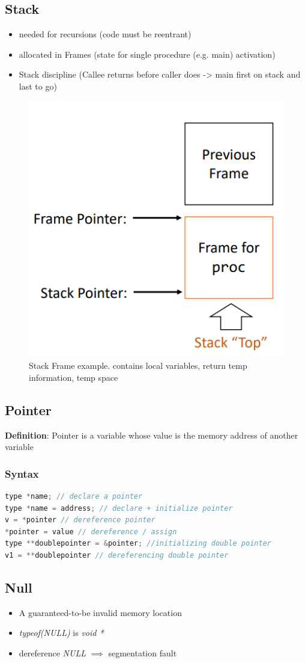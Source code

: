 \documentclass[a4paper,10pt]{article}
\begin{document}
\subsection{Stack}
\begin{itemize}
    \item needed for recursions (code must be reentrant)
    \item allocated in Frames (state for single procedure (e.g. main) activation)
    \item Stack discipline (Callee returns before caller does -> main first on stack and last to go)
\end{itemize}
\begin{figure}[H]
    \centering
    \includegraphics[width=0.5\linewidth]{Pictures/e20.png}
    \caption{Stack Frame example. contains local variables, return temp information, temp space}
    \label{fig:enter-label}
\end{figure}
\subsection{Pointer}
\textbf{Definition}: Pointer is a variable whose value is the memory address of another variable
\subsubsection{Syntax}
\begin{lstlisting}[language=C++]
type *name; // declare a pointer 
type *name = address; // declare + initialize pointer
v = *pointer // dereference pointer
*pointer = value // dereference / assign
type **doublepointer = &pointer; //initializing double pointer
v1 = **doublepointer // dereferencing double pointer
\end{lstlisting}
\subsection{Null}
\begin{itemize}
    \item A guaranteed-to-be invalid memory location
    \item \textit{typeof(NULL)} is \textit{void *}
    \item dereference \textit{NULL} $\implies$ segmentation fault
\end{itemize}
\end{document}

